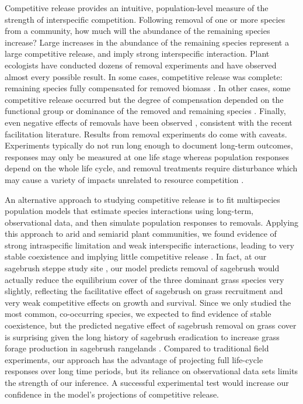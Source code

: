 \documentclass[11pt]{article}
\begin{document}
\begin{doublespacing}
Competitive release provides an intuitive, population-level measure of the strength of interspecific competition. Following removal of one or more species from a community, how much will the abundance of the remaining species increase? Large increases in the abundance of the remaining species represent a large competitive release, and imply strong interspecific interaction. Plant ecologists have conducted dozens of removal experiments and have observed almost every possible result. In some cases, competitive release was complete: remaining species fully compensated for removed biomass \citep{leps_nutrient_1999,jutila_effects_2002}. In other cases, some competitive release occurred but the degree of compensation depended on the functional group or dominance of the removed and remaining species \citep{sala_resource_1989,belsky_effects_1992,smith_dominant_2003}. Finally, even negative effects of removals have been observed \citep{keddy_effects_1989,gilbert_dominant_2009}, consistent with the recent facilitation literature. Results from removal experiments do come with caveats. Experiments typically do not run long enough to document long-term outcomes, responses may only be measured at one life stage whereas population responses depend on the whole life cycle, and removal treatments require disturbance which may cause a variety of impacts unrelated to resource competition \citep{aarssen_neighbour_1990}.

An alternative approach to studying competitive release is to fit multispecies population models that estimate species interactions using long-term, observational data, and then simulate population responses to removals. Applying this approach to arid and semiarid plant communities, we found evidence of strong intraspecific limitation and weak interspecific interactions, leading to very stable coexistence and implying little competitive release \citep{adler_coexistence_2010,chu_large_2015}. In fact, at our sagebrush steppe study site  \citep{adler_coexistence_2010}, our model predicts removal of sagebrush would actually reduce the equilibrium cover of the three dominant grass species very slightly, reflecting the facilitative effect of sagebrush on grass recruitment and very weak competitive effects on growth and survival.  Since we only studied the most common, co-occurring species, we expected to find evidence of stable coexistence, but the predicted negative effect of sagebrush removal on grass cover is surprising given the long history of sagebrush eradication to increase grass forage production in sagebrush rangelands \citep{Robertson1947,Mueggler1958,Cook1963}.
Compared to traditional field experiments, our approach has the advantage of projecting full life-cycle responses over long time periods, but its reliance on observational data sets limits the strength of our inference. A successful experimental test would increase our confidence in the model's projections of competitive release.


\end{doublespacing}
\end{document}
